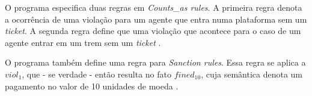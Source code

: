 O programa especifica duas regras em \textit{Counts\_as rules}. A primeira regra denota a ocorrência de uma violação para um agente que entra numa plataforma sem um \textit{ticket}. A segunda regra define que uma violação que acontece para o caso de um agente entrar em um trem sem um \textit{ticket} \cite{dastaniframework}.

O programa também define uma regra para \textit{Sanction rules}. Essa regra se aplica a $viol_1$, que - se verdade - então resulta no fato $fined_{10}$, cuja semântica denota um pagamento no valor de 10 unidades de moeda \cite{dastaniframework}.  